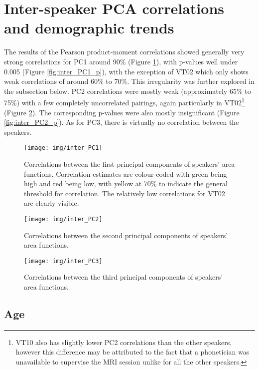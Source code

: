 \section{Inter-speaker PCA correlations and demographic trends}\label{results-inter}

The results of the Pearson product-moment correlations showed generally very strong correlations for PC1 around 90\% (Figure \ref{fig:inter_PC1}), with p-values well under 0.005 (Figure \ref{fig:inter_PC1_p}), with the exception of VT02 which only shows weak correlations of around 60\% to 70\%. This irregularity was further explored in the subsection below. PC2 correlations were mostly weak (approximately 65\% to 75\%) with a few completely uncorrelated pairings, again particularly in VT02\footnote{VT10 also has slightly lower PC2 correlations than the other speakers, however this difference may be attributed to the fact that a phonetician was unavailable to supervise the MRI session unlike for all the other speakers.} (Figure \ref{fig:inter_PC2}). The corresponding p-values were also mostly insignificant (Figure \ref{fig:inter_PC2_p}). As for PC3, there is virtually no correlation between the speakers.

\begin{figure}[H]
    \centering
    \texttt{[image: img/inter\_PC1]}
    \caption{Correlations between the first principal components of speakers' area functions. Correlation estimates are colour-coded with green being high and red being low, with yellow at 70\% to indicate the general threshold for correlation. The relatively low correlations for VT02 are clearly visible.}
    \label{fig:inter_PC1}
\end{figure}

\begin{figure}[H]
    \centering
    \texttt{[image: img/inter\_PC2]}
    \caption{Correlations between the second principal components of speakers' area functions.}
    \label{fig:inter_PC2}
\end{figure}

\begin{figure}[H]
    \centering
    \texttt{[image: img/inter\_PC3]}
    \caption{Correlations between the third principal components of speakers' area functions.}
    \label{fig:inter_PC3}
\end{figure}

\subsection{Age}


